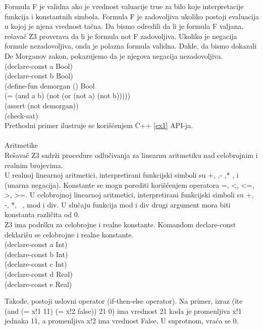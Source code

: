\documentclass[12pt,oneside]{memoir}
\begin{document}
Formula F je validna ako je vrednost valuacije true za bilo koje interpretacije funkcija i konstantnih simbola. Formula F je zadovoljiva ukoliko postoji evaluacija u kojoj je njena vrednost tačna. Da bismo odredili da li je formula F valjana, rešavač Z3 proverava da li je formula not F zadovoljiva. Ukoliko je negacija formule nezadovoljiva, onda je polazna formula validna. Dakle, da bismo dokazali De Morganov zakon, pokazujemo da je njegova negacija nezadovoljiva. 
\\(declare-const a Bool)
\\(declare-const b Bool)
\\(define-fun demorgan () Bool
\\    (= (and a b) (not (or (not a) (not b)))))
\\(assert (not demorgan))
\\(check-sat) \\
Prethodni primer ilustruje se korišćenjem C++ \ref{ex1} API-ja.
\\ \\



Aritmetike\\
Rešavač Z3 sadrži procedure odlučivanja za linearnu aritmetiku nad celobrojnim i realnim brojevima.
\\
U realnoj linearnoj aritmetici, interpretirani funkcijski simboli su +, ,- ,* , i ~ (unarna negacija). Konstante se mogu porediti korišćenjem operatora =, <, <=, >, >=. U celobrojnoj linearnoj aritmetici, interpretirani funkcijski simboli su +, -, *, ~, mod i div. U slučaju funkcija mod i div drugi argument mora biti konstanta različita od 0.  
\\
Z3 ima podršku za celobrojne i realne konstante. Komandom declare-const deklarišu se celobrojne i realne konstante.
\\(declare-const a Int)
\\(declare-const b Int)
\\(declare-const c Int)
\\(declare-const d Real)
\\(declare-const e Real)

Takođe, postoji uslovni operator (if-then-else operator). Na primer,
izraz (ite (and (= x!1 11) (= x!2 false)) 21 0) ima vrednost 21 kada je promenljiva x!1 jednaka 11, a promenljiva x!2 ima vrednost False. U suprotnom, vraća se 0.
\end{document}
